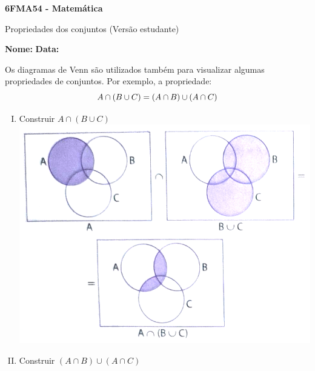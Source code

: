 \documentclass[a4paper,14pt]{article}
\begin{document}
	
	\noindent\textbf{6FMA54 - Matemática} 
	
	\begin{center}Propriedades dos conjuntos (Versão estudante)
	\end{center}
	
	\noindent\textbf{Nome:} \underline{\hspace{10cm}}
	\noindent\textbf{Data:} \underline{\hspace{4cm}}
	
	\begin{multicols}{2}
    		\noindent Os diagramas de Venn são utilizados também para visualizar algumas propriedades de conjuntos. Por exemplo, a propriedade: \\
    		\begin{equation*} A \cap (B \cup C) = (A \cap B) \cup (A \cap C) \\ \end{equation*}
    		\begin{enumerate}[I.]
    			\item Construir $A\cap (B \cup C)$
    			\includegraphics[width=1.1\linewidth]{"6FMA54_imagens/imagem1"}
    			\columnbreak
    			\item Construir $(A \cap B) \cup (A \cap C)$

\end{enumerate}
\end{multicols}
\end{document}
